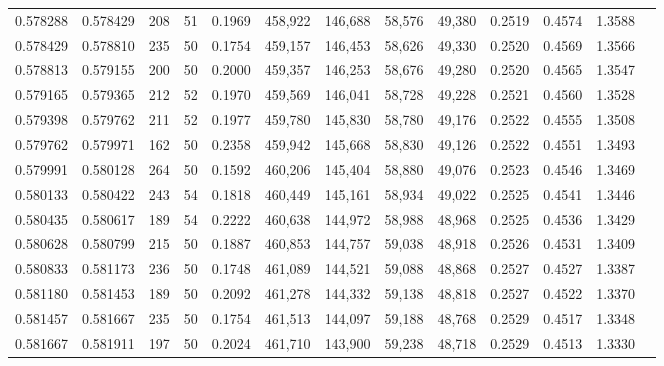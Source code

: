 \begin{tabular}{rrrrrrrrrrrrr}
0.578288 & 0.578429 &    208 &    51 &                                     0.1969 & 458,922 & 146,688 &  58,576 &  49,380 & 0.2519 & 0.4574 & 1.3588 \\
0.578429 & 0.578810 &    235 &    50 &                                     0.1754 & 459,157 & 146,453 &  58,626 &  49,330 & 0.2520 & 0.4569 & 1.3566 \\
0.578813 & 0.579155 &    200 &    50 &                                     0.2000 & 459,357 & 146,253 &  58,676 &  49,280 & 0.2520 & 0.4565 & 1.3547 \\
0.579165 & 0.579365 &    212 &    52 &                                     0.1970 & 459,569 & 146,041 &  58,728 &  49,228 & 0.2521 & 0.4560 & 1.3528 \\
0.579398 & 0.579762 &    211 &    52 &                                     0.1977 & 459,780 & 145,830 &  58,780 &  49,176 & 0.2522 & 0.4555 & 1.3508 \\
0.579762 & 0.579971 &    162 &    50 &                                     0.2358 & 459,942 & 145,668 &  58,830 &  49,126 & 0.2522 & 0.4551 & 1.3493 \\
0.579991 & 0.580128 &    264 &    50 &                                     0.1592 & 460,206 & 145,404 &  58,880 &  49,076 & 0.2523 & 0.4546 & 1.3469 \\
0.580133 & 0.580422 &    243 &    54 &                                     0.1818 & 460,449 & 145,161 &  58,934 &  49,022 & 0.2525 & 0.4541 & 1.3446 \\
0.580435 & 0.580617 &    189 &    54 &                                     0.2222 & 460,638 & 144,972 &  58,988 &  48,968 & 0.2525 & 0.4536 & 1.3429 \\
0.580628 & 0.580799 &    215 &    50 &                                     0.1887 & 460,853 & 144,757 &  59,038 &  48,918 & 0.2526 & 0.4531 & 1.3409 \\
0.580833 & 0.581173 &    236 &    50 &                                     0.1748 & 461,089 & 144,521 &  59,088 &  48,868 & 0.2527 & 0.4527 & 1.3387 \\
0.581180 & 0.581453 &    189 &    50 &                                     0.2092 & 461,278 & 144,332 &  59,138 &  48,818 & 0.2527 & 0.4522 & 1.3370 \\
0.581457 & 0.581667 &    235 &    50 &                                     0.1754 & 461,513 & 144,097 &  59,188 &  48,768 & 0.2529 & 0.4517 & 1.3348 \\
0.581667 & 0.581911 &    197 &    50 &                                     0.2024 & 461,710 & 143,900 &  59,238 &  48,718 & 0.2529 & 0.4513 & 1.3330 \\

\end{tabular}
